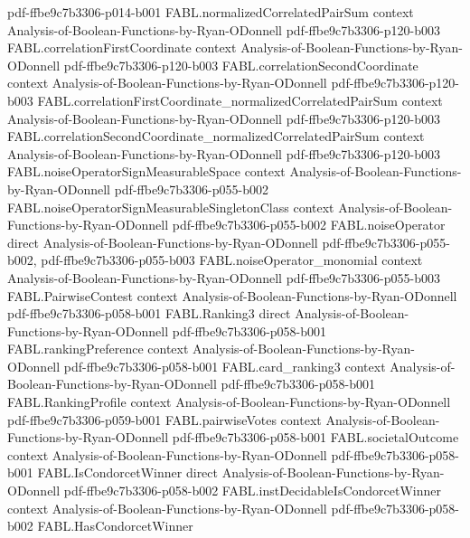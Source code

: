 \begin{theorem}
  {pdf-ffbe9c7b3306-p014-b001}
\proofstep
  {FABL.normalizedCorrelatedPairSum}
  {context}
  {Analysis-of-Boolean-Functions-by-Ryan-ODonnell}
  {pdf-ffbe9c7b3306-p120-b003}
\proofstep
  {FABL.correlationFirstCoordinate}
  {context}
  {Analysis-of-Boolean-Functions-by-Ryan-ODonnell}
  {pdf-ffbe9c7b3306-p120-b003}
\proofstep
  {FABL.correlationSecondCoordinate}
  {context}
  {Analysis-of-Boolean-Functions-by-Ryan-ODonnell}
  {pdf-ffbe9c7b3306-p120-b003}
\proofstep
  {FABL.correlationFirstCoordinate_normalizedCorrelatedPairSum}
  {context}
  {Analysis-of-Boolean-Functions-by-Ryan-ODonnell}
  {pdf-ffbe9c7b3306-p120-b003}
\proofstep
  {FABL.correlationSecondCoordinate_normalizedCorrelatedPairSum}
  {context}
  {Analysis-of-Boolean-Functions-by-Ryan-ODonnell}
  {pdf-ffbe9c7b3306-p120-b003}
\proofstep
  {FABL.noiseOperatorSignMeasurableSpace}
  {context}
  {Analysis-of-Boolean-Functions-by-Ryan-ODonnell}
  {pdf-ffbe9c7b3306-p055-b002}
\proofstep
  {FABL.noiseOperatorSignMeasurableSingletonClass}
  {context}
  {Analysis-of-Boolean-Functions-by-Ryan-ODonnell}
  {pdf-ffbe9c7b3306-p055-b002}
\proofstep
  {FABL.noiseOperator}
  {direct}
  {Analysis-of-Boolean-Functions-by-Ryan-ODonnell}
  {pdf-ffbe9c7b3306-p055-b002,
    pdf-ffbe9c7b3306-p055-b003}
\proofstep
  {FABL.noiseOperator_monomial}
  {context}
  {Analysis-of-Boolean-Functions-by-Ryan-ODonnell}
  {pdf-ffbe9c7b3306-p055-b003}
\proofstep
  {FABL.PairwiseContest}
  {context}
  {Analysis-of-Boolean-Functions-by-Ryan-ODonnell}
  {pdf-ffbe9c7b3306-p058-b001}
\proofstep
  {FABL.Ranking3}
  {direct}
  {Analysis-of-Boolean-Functions-by-Ryan-ODonnell}
  {pdf-ffbe9c7b3306-p058-b001}
\proofstep
  {FABL.rankingPreference}
  {context}
  {Analysis-of-Boolean-Functions-by-Ryan-ODonnell}
  {pdf-ffbe9c7b3306-p058-b001}
\proofstep
  {FABL.card_ranking3}
  {context}
  {Analysis-of-Boolean-Functions-by-Ryan-ODonnell}
  {pdf-ffbe9c7b3306-p058-b001}
\proofstep
  {FABL.RankingProfile}
  {context}
  {Analysis-of-Boolean-Functions-by-Ryan-ODonnell}
  {pdf-ffbe9c7b3306-p059-b001}
\proofstep
  {FABL.pairwiseVotes}
  {context}
  {Analysis-of-Boolean-Functions-by-Ryan-ODonnell}
  {pdf-ffbe9c7b3306-p058-b001}
\proofstep
  {FABL.societalOutcome}
  {context}
  {Analysis-of-Boolean-Functions-by-Ryan-ODonnell}
  {pdf-ffbe9c7b3306-p058-b001}
\proofstep
  {FABL.IsCondorcetWinner}
  {direct}
  {Analysis-of-Boolean-Functions-by-Ryan-ODonnell}
  {pdf-ffbe9c7b3306-p058-b002}
\proofstep
  {FABL.instDecidableIsCondorcetWinner}
  {context}
  {Analysis-of-Boolean-Functions-by-Ryan-ODonnell}
  {pdf-ffbe9c7b3306-p058-b002}
\proofstep
  {FABL.HasCondorcetWinner}

\end{theorem}
